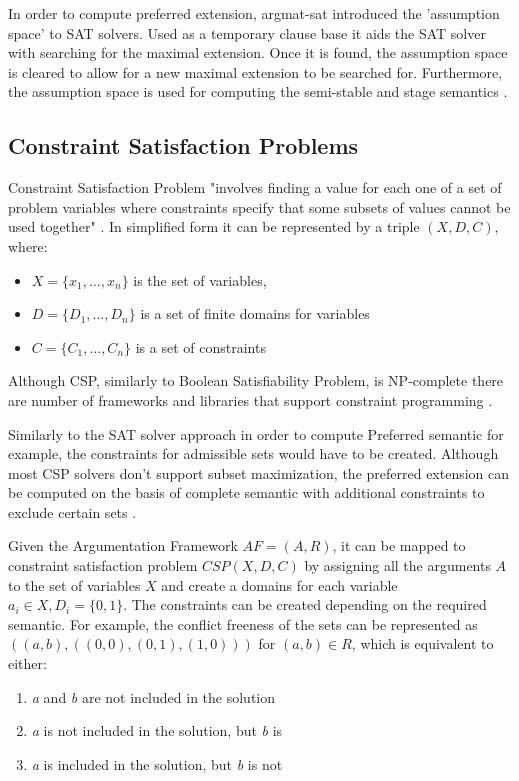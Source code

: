 In order to compute preferred extension, argmat-sat introduced the 'assumption space' to SAT solvers. Used as a temporary clause base it aids the SAT solver with searching for the maximal extension. Once it is found, the assumption space is cleared to allow for a new maximal extension to be searched for. Furthermore, the assumption space is used for computing the semi-stable and stage semantics \citep{argmatSat}.


\subsection{Constraint Satisfaction Problems}
Constraint Satisfaction Problem "involves finding a value for each one of a set of problem variables where constraints specify that some subsets of values cannot be used together" \citep{csp1}. In simplified form it can be represented by a triple $(X, D, C)$, where:
\begin{itemize}
	\item $X = \{x_1, \ldots, x_n\} $ is the set of variables,
	\item $ D = \{D_1, \ldots, D_n \} $ is a set of finite domains for variables
	\item $ C = \{ C_1, \ldots, C_n \} $ is a set of constraints
\end{itemize}
Although CSP, similarly to Boolean Satisfiability Problem, is NP-complete there are number of frameworks and libraries that support constraint programming \citep{solvingMethods}.

Similarly to the SAT solver approach in order to compute Preferred semantic for example, the constraints for admissible sets would have to be created. Although most CSP solvers don't support subset maximization, the preferred extension can be computed on the basis of complete semantic with additional constraints to exclude certain sets \citep{solvingMethods}.

Given the Argumentation Framework $ AF = (A,R)$, it can be mapped to constraint satisfaction problem $ CSP(X,D,C) $ by assigning all the arguments $A$ to the set of variables $X$ and create a domains for each variable $ a_i \in X, D_i = \{0,1\} $. The constraints can be created depending on the required semantic. For example, the conflict freeness of the sets can be represented as $((a,b),((0,0), (0,1),(1,0)))$ for $(a,b) \in R$, which is equivalent to either:
\begin{enumerate}
	\item \textit{a} and \textit{b} are not included in the solution
	\item \textit{a} is not included in the solution, but \textit{b} is
	\item \textit{a} is included in the solution, but \textit{b} is not
\end{enumerate}

